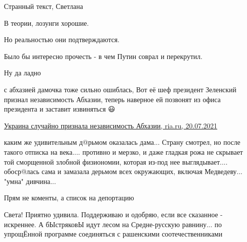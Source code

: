 \begin{itemize}
Странный текст, Светлана

В теории, лозунги хорошие.

Но реальностью они подтверждаются.

Было бы интересно прочесть - в чем Путин соврал и перекрутил.

Ну да ладно

 

с абхазией дамочка тоже сильно ошиблась, Вот её шеф президент Зеленский признал независимость Абхазии, теперь наверное ей позвонят из офиса президента и заставит извиняться 😃

\href{https://ria.ru/20210720/priznanie-1742047208.html}{%
Украина случайно признала независимость Абхазии, ria.ru, 20.07.2021%
}

 

каким же удивительным д@рьмом оказалась дама... Страну смотрел, но после такого
отписка на века.... противно и мерзко, и даже гладкая рожа не скрывает той
сморщенной злобной физиономии, которая из-под нее выглядывает.... обоср@лась
сама и замазала дерьмом всех окружающих, включая Медведеву... "умна" дивчина...

 
Прям не коменты, а список на депортацию\Laughey[1.0][white]

 

Света! Приятно удивила. Поддерживаю и одобряю, если все сказанное - искреннее.
А бЫстряковЫ идут лесом на Средне-русскую равнину... по упрощЁнной программе
соединяться с рашенскими соотечественниками



\end{itemize}
